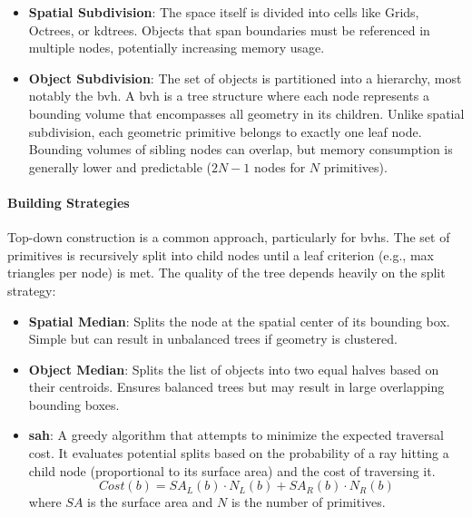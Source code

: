 \begin{itemize}
    \item \textbf{Spatial Subdivision}:
        The space itself is divided into cells like Grids, Octrees, or \glspl{kdtree}.
        Objects that span boundaries must be referenced in multiple nodes, potentially increasing memory usage.
    \item \textbf{Object Subdivision}:
        The set of objects is partitioned into a hierarchy, most notably the \gls{bvh}.
        A \gls{bvh} is a tree structure where each node represents a bounding volume
        that encompasses all geometry in its children.
        Unlike spatial subdivision, each geometric primitive belongs to exactly one leaf node.
        Bounding volumes of sibling nodes can overlap,
        but memory consumption is generally lower and predictable ($2N-1$ nodes for $N$ primitives).
\end{itemize}

\paragraph{Building Strategies}\label{par:building-strategies}

Top-down construction is a common approach, particularly for \glspl{bvh}.
The set of primitives is recursively split into child nodes
until a leaf criterion (e.g., max triangles per node) is met.
The quality of the tree depends heavily on the split strategy:

\begin{itemize}
    \item \textbf{Spatial Median}:
        Splits the node at the spatial center of its bounding box.
        Simple but can result in unbalanced trees if geometry is clustered.
    \item \textbf{Object Median}:
        Splits the list of objects into two equal halves based on their centroids.
        Ensures balanced trees but may result in large overlapping bounding boxes.
    \item \textbf{\gls{sah}}:
        A greedy algorithm that attempts to minimize the expected traversal cost.
        It evaluates potential splits based on the probability of a ray hitting a child node
        (proportional to its surface area) and the cost of traversing it.
        \[
        Cost(b) = SA_L(b) \cdot N_L(b) + SA_R(b) \cdot N_R(b)
        \]
        where $SA$ is the surface area and $N$ is the number of primitives.
\end{itemize}

